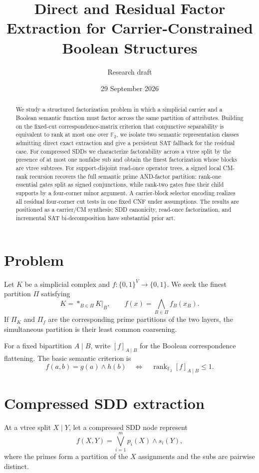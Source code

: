 \documentclass[11pt]{article}
\title{Direct and Residual Factor Extraction for Carrier-Constrained Boolean Structures}
\author{Research draft}
\date{29 September 2026}
\newcommand{\F}{\mathbb F}
\begin{document}
\maketitle

\begin{abstract}
We study a structured factorization problem in which a simplicial carrier and a Boolean semantic function must factor across the same partition of attributes.  Building on the fixed-cut correspondence-matrix criterion that conjunctive separability is equivalent to rank at most one over $\F_2$, we isolate two semantic representation classes admitting direct exact extraction and give a persistent SAT fallback for the residual case.  For compressed SDDs we characterize factorability across a vtree split by the presence of at most one nonfalse sub and obtain the finest factorization whose blocks are vtree subtrees.  For support-disjoint read-once operator trees, a signed local CM-rank recursion recovers the full semantic prime AND-factor partition: rank-one essential gates split as signed conjunctions, while rank-two gates fuse their child supports by a four-corner minor argument.  A carrier-block selector encoding realizes all residual four-corner cut tests in one fixed CNF under assumptions.  The results are positioned as a carrier/CM synthesis; SDD canonicity, read-once factorization, and incremental SAT bi-decomposition have substantial prior art.
\end{abstract}

\section{Problem}
Let $K$ be a simplicial complex and $f:\{0,1\}^V\to\{0,1\}$.  We seek the finest partition $\Pi$ satisfying
\[
K=*_{B\in\Pi}K|_B,
\qquad
f(x)=\bigwedge_{B\in\Pi}f_B(x_B).
\]
If $\Pi_K$ and $\Pi_f$ are the corresponding prime partitions of the two layers, the simultaneous partition is their least common coarsening.

For a fixed bipartition $A\mid B$, write $[f]_{A\mid B}$ for the Boolean correspondence flattening.  The basic semantic criterion is
\[
f(a,b)=g(a)\land h(b)
\quad\Longleftrightarrow\quad
\operatorname{rank}_{\F_2}[f]_{A\mid B}\le 1.
\]

\section{Compressed SDD extraction}
At a vtree split $X\mid Y$, let a compressed SDD node represent
\[
f(X,Y)=\bigvee_{i=1}^m p_i(X)\land s_i(Y),
\]
where the primes form a partition of the $X$ assignments and the subs are pairwise distinct.
\end{document}
